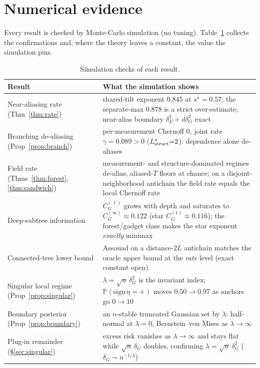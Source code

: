 \documentclass[11pt]{article}
\theoremstyle{plain}
\theoremstyle{definition}\newtheorem{definition}{Definition}\newtheorem{assumption}{Assumption}
\newcommand{\Pf}{\mathbb{P}}\newcommand{\I}{\mathbb{1}}\newcommand{\HH}{\mathbb{H}}
\begin{document}
\section{Numerical evidence}\label{sec:num}
Every result is checked by Monte-Carlo simulation (no tuning). Table~\ref{tab:num} collects the confirmations and,
where the theory leaves a constant, the value the simulation pins.
\begin{table}[h]\small
\caption{Simulation checks of each result.}\label{tab:num}
\begin{center}
\begin{tabular}{@{}p{}p{}@{}}
\toprule
Result & What the simulation shows \\ \midrule
Near-aliasing rate (Thm~\ref{thm:rate}) & shared-tilt exponent $0.845$ at $s^\star{=}0.57$; the separate-max $0.878$ is a strict over-estimate; near-alias boundary $\delta_E^2+d\delta_G^2$ exact \\[2pt]
Branching de-aliasing (Prop~\ref{prop:branch}) & per-measurement Chernoff $0$, joint rate $\gamma{=}0.089>0$ ($L^\star_{\mathrm{struct}}{=}2$): dependence alone de-aliases \\[2pt]
Field rate (Thms~\ref{thm:forest},\ref{thm:sandwich}) & measurement- and structure-dominated regimes de-alias, aliased-$T$ floors at chance; on a disjoint-neighborhood antichain the field rate equals the local Chernoff rate \\[2pt]
Deep-subtree information & $C_G^{(\ell)}$ grows with depth and saturates to $C_G^{(\infty)}\approx0.122$ (star $C_G^{(1)}\approx0.116$); the forest/gadget class makes the star exponent \emph{exactly} minimax \\[2pt]
Connected-tree lower bound & Assouad on a distance-$2L$ antichain matches the oracle upper bound at the \emph{rate} level (exact constant open) \\[2pt]
Singular local regime (Prop~\ref{prop:singular}) & $\lambda=\sqrt n\,\delta_G^2$ is the invariant index; $\Pf(\mathrm{sign}\,\eta{=}{+})$ moves $0.50\!\to\!0.97$ as anchors go $0\!\to\!10$ \\[2pt]
Boundary posterior (Prop~\ref{prop:boundary}) & an $n$-stable truncated Gaussian set by $\lambda$: half-normal at $\lambda{=}0$, Bernstein--von Mises as $\lambda\to\infty$ \\[2pt]
Plug-in remainder (\S\ref{sec:singular}) & excess risk vanishes as $\lambda\to\infty$ and stays flat while $\sqrt n\,\delta_G$ doubles, confirming $\lambda=\sqrt n\,\delta_G^2$ ($\delta_G\sim n^{-1/4}$) \\
\bottomrule
\end{tabular}
\end{center}
\end{table}
\end{document}
